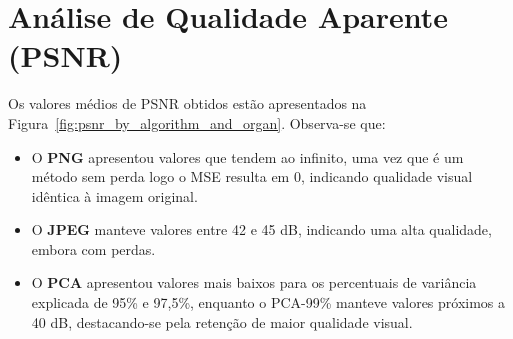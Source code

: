 \begin{figure}[H]
	\centering
\end{figure}

\section{Análise de Qualidade Aparente (\acrshort{PSNR})}

Os valores médios de \acrshort{PSNR} obtidos estão apresentados na Figura~\ref{fig:psnr_by_algorithm_and_organ}. Observa-se que:

\begin{itemize}
    \item O \textbf{\acrshort{PNG}} apresentou valores que tendem ao infinito, uma vez que é um método sem perda logo o \acrshort{MSE} resulta em 0, indicando qualidade visual idêntica à imagem original.
    \item O \textbf{\acrshort{JPEG}} manteve valores entre 42 e 45 dB, indicando uma alta qualidade, embora com perdas.
    \item O \textbf{\acrshort{PCA}} apresentou valores mais baixos para os percentuais de variância explicada de 95\% e 97,5\%, enquanto o PCA-99\% manteve valores próximos a 40 dB, destacando-se pela retenção de maior qualidade visual.
\end{itemize}


